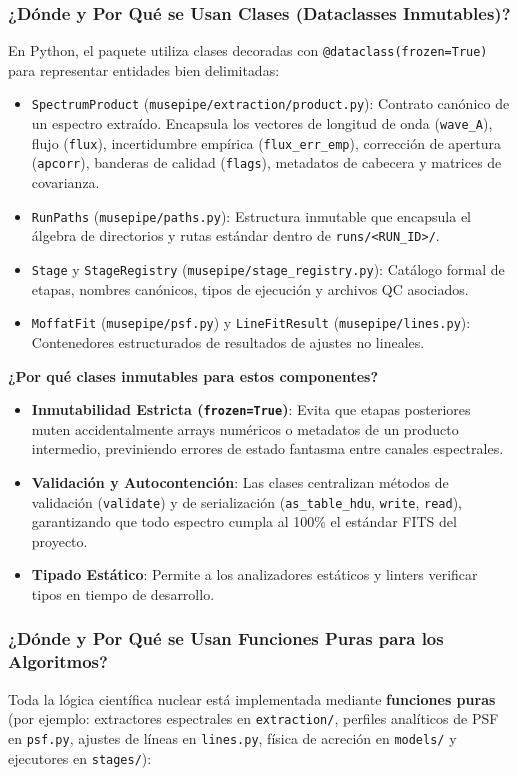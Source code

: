 \documentclass[11pt,a4paper]{article}
\begin{document}
\subsubsection{¿Dónde y Por Qué se Usan Clases (Dataclasses Inmutables)?}
En Python, el paquete utiliza clases decoradas con \texttt{@dataclass(frozen=True)} para representar entidades bien delimitadas:
\begin{itemize}[leftmargin=1.0cm]
    \item \texttt{SpectrumProduct} (\texttt{musepipe/extraction/product.py}): Contrato canónico de un espectro extraído. Encapsula los vectores de longitud de onda (\texttt{wave\_A}), flujo (\texttt{flux}), incertidumbre empírica (\texttt{flux\_err\_emp}), corrección de apertura (\texttt{apcorr}), banderas de calidad (\texttt{flags}), metadatos de cabecera y matrices de covarianza.
    \item \texttt{RunPaths} (\texttt{musepipe/paths.py}): Estructura inmutable que encapsula el álgebra de directorios y rutas estándar dentro de \texttt{runs/<RUN\_ID>/}.
    \item \texttt{Stage} y \texttt{StageRegistry} (\texttt{musepipe/stage\_registry.py}): Catálogo formal de etapas, nombres canónicos, tipos de ejecución y archivos QC asociados.
    \item \texttt{MoffatFit} (\texttt{musepipe/psf.py}) y \texttt{LineFitResult} (\texttt{musepipe/lines.py}): Contenedores estructurados de resultados de ajustes no lineales.
\end{itemize}

\noindent\textbf{¿Por qué clases inmutables para estos componentes?}
\begin{itemize}[leftmargin=1.0cm]
    \item \textbf{Inmutabilidad Estricta (\texttt{frozen=True})}: Evita que etapas posteriores muten accidentalmente arrays numéricos o metadatos de un producto intermedio, previniendo errores de estado fantasma entre canales espectrales.
    \item \textbf{Validación y Autocontención}: Las clases centralizan métodos de validación (\texttt{validate}) y de serialización (\texttt{as\_table\_hdu}, \texttt{write}, \texttt{read}), garantizando que todo espectro cumpla al 100\% el estándar FITS del proyecto.
    \item \textbf{Tipado Estático}: Permite a los analizadores estáticos y linters verificar tipos en tiempo de desarrollo.
\end{itemize}

\subsubsection{¿Dónde y Por Qué se Usan Funciones Puras para los Algoritmos?}
Toda la lógica científica nuclear está implementada mediante \textbf{funciones puras} (por ejemplo: extractores espectrales en \texttt{extraction/}, perfiles analíticos de PSF en \texttt{psf.py}, ajustes de líneas en \texttt{lines.py}, física de acreción en \texttt{models/} y ejecutores en \texttt{stages/}):
\end{document}
